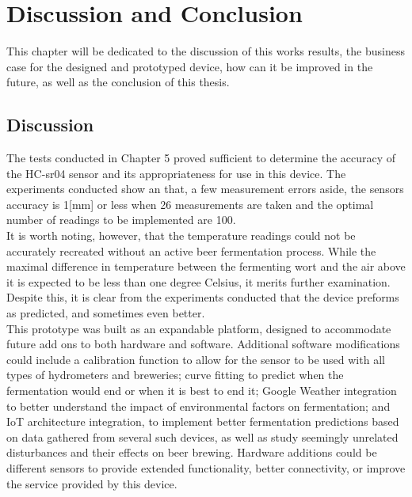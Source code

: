 \documentclass[twoside]{ctuthesis}
\theoremstyle{plain}
\theoremstyle{definition}
\theoremstyle{note}
\begin{document}
\pagebreak 

\begingroup
\renewcommand{\cleardoublepage}{}
\renewcommand{\clearpage}{}
\chapter{Discussion and Conclusion}
\endgroup
This chapter will be dedicated to the discussion of this works results, the business case for the designed and prototyped device, how can it be improved in the future, as well as the conclusion of this thesis.

\section{Discussion}
The tests conducted in Chapter 5 proved sufficient to determine the accuracy of the HC-sr04 sensor and its appropriateness for use in this device.	The experiments conducted show an that, a few measurement errors aside, the sensors accuracy is 1[mm] or less when 26 measurements are taken and the optimal number of readings to be implemented are 100.\\
It is worth noting, however, that the temperature readings could not be accurately recreated without an active beer fermentation process. While the maximal difference in temperature between the fermenting wort and the air above it is expected to be less than one degree Celsius\cite{Thermodynamics_Brewers}, it merits further examination. Despite this, it is clear from the experiments conducted that the device preforms as predicted, and sometimes even better.\\
This prototype was built as an expandable platform, designed to accommodate future add ons to both hardware and software. Additional software modifications could include a calibration function to allow for the sensor to be used with all types of hydrometers and breweries; curve fitting to predict when the fermentation would end or when it is best to end it; Google Weather integration to better understand the impact of environmental factors on fermentation; and IoT architecture integration, to implement better fermentation predictions based on data gathered from several such devices, as well as study seemingly unrelated disturbances and their effects on beer brewing.
Hardware additions could be different sensors to provide extended functionality, better connectivity, or improve the service provided by this device.

\pagebreak
\end{document}
